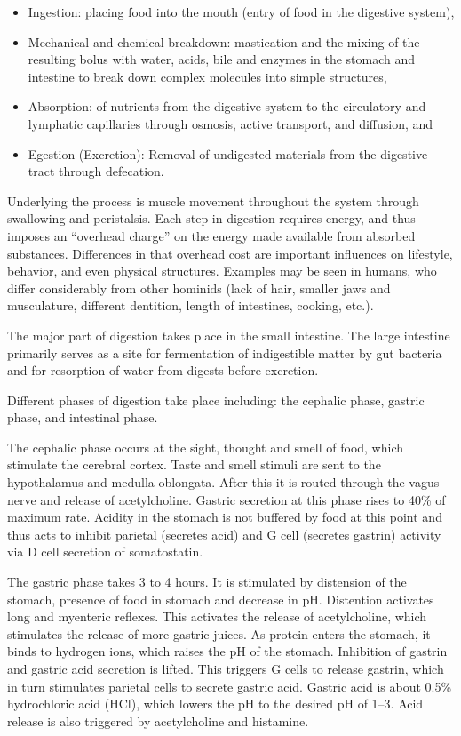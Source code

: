 \begin{itemize}
\tightlist
\item
  Ingestion: placing food into the mouth (entry of food in the digestive system),
\item
  Mechanical and chemical breakdown: mastication and the mixing of the resulting bolus with water, acids, bile and enzymes in the stomach and intestine to break down complex molecules into simple structures,
\item
  Absorption: of nutrients from the digestive system to the circulatory and lymphatic capillaries through osmosis, active transport, and diffusion, and
\item
  Egestion (Excretion): Removal of undigested materials from the digestive tract through defecation.
\end{itemize}

Underlying the process is muscle movement throughout the system through swallowing and peristalsis. Each step in digestion requires energy, and thus imposes an ``overhead charge'' on the energy made available from absorbed substances. Differences in that overhead cost are important influences on lifestyle, behavior, and even physical structures. Examples may be seen in humans, who differ considerably from other hominids (lack of hair, smaller jaws and musculature, different dentition, length of intestines, cooking, etc.).

The major part of digestion takes place in the small intestine. The large intestine primarily serves as a site for fermentation of indigestible matter by gut bacteria and for resorption of water from digests before excretion.

Different phases of digestion take place including: the cephalic phase, gastric phase, and intestinal phase.

The cephalic phase occurs at the sight, thought and smell of food, which stimulate the cerebral cortex. Taste and smell stimuli are sent to the hypothalamus and medulla oblongata. After this it is routed through the vagus nerve and release of acetylcholine. Gastric secretion at this phase rises to 40\% of maximum rate. Acidity in the stomach is not buffered by food at this point and thus acts to inhibit parietal (secretes acid) and G cell (secretes gastrin) activity via D cell secretion of somatostatin.

The gastric phase takes 3 to 4 hours. It is stimulated by distension of the stomach, presence of food in stomach and decrease in pH. Distention activates long and myenteric reflexes. This activates the release of acetylcholine, which stimulates the release of more gastric juices. As protein enters the stomach, it binds to hydrogen ions, which raises the pH of the stomach. Inhibition of gastrin and gastric acid secretion is lifted. This triggers G cells to release gastrin, which in turn stimulates parietal cells to secrete gastric acid. Gastric acid is about 0.5\% hydrochloric acid (HCl), which lowers the pH to the desired pH of 1--3. Acid release is also triggered by acetylcholine and histamine.

